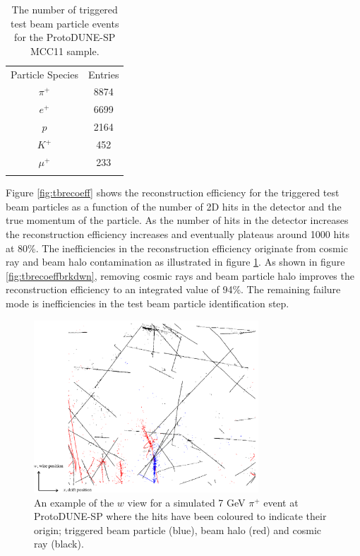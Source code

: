 \begin{table}
\centering
\caption{The number of triggered test beam particle events for the ProtoDUNE-SP MCC11 sample.}
\label{tab:mcc11species} 
\begin{tabular}{cc}
\hline\noalign{\smallskip}
Particle Species & Entries  \\
\noalign{\smallskip}\hline\noalign{\smallskip}
$\pi^{+}$ & 8874 \\
$e^{+}$ & 6699 \\
$p$ & 2164 \\
$K^{+}$ & 452 \\
$\mu^{+}$ & 233 \\
\noalign{\smallskip}\hline
\end{tabular}
\end{table}

Figure \ref{fig:tbrecoeff} shows the reconstruction efficiency for the triggered test beam particles as a function of the number of 2D hits in the detector and the true momentum of the particle.  As the number of hits in the detector increases the reconstruction efficiency increases and eventually plateaus around 1000 hits at 80\%.  The inefficiencies in the reconstruction efficiency originate from cosmic ray and beam halo contamination as illustrated in figure \ref{fig:eventdecomp}.  As shown in figure \ref{fig:tbrecoeffbrkdwn}, removing cosmic rays and beam particle halo improves the reconstruction efficiency to an integrated value of 94\%.  The remaining failure mode is inefficiencies in the test beam particle identification step.

\begin{figure}
\includegraphics[width=0.75\textwidth]{Figures/EventDisplays/MC/EventComposition.pdf} 
\caption{An example of the $w$ view for a simulated 7 GeV $\pi^{+}$ event at ProtoDUNE-SP where the hits have been coloured to indicate their origin; triggered beam particle (blue), beam halo (red) and cosmic ray (black).}
\label{fig:eventdecomp}
\end{figure}

